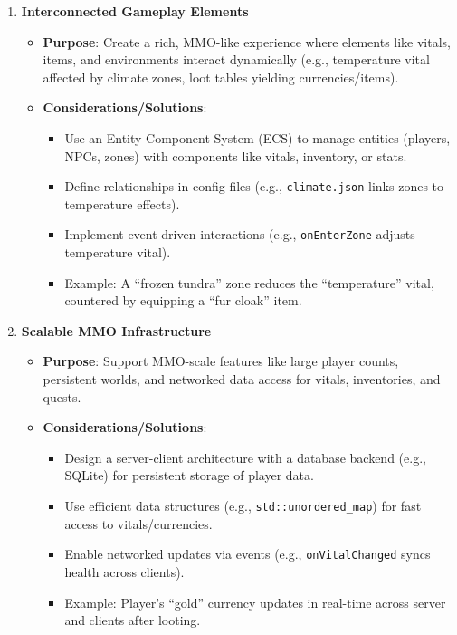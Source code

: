 \begin{enumerate}
    \item \textbf{Interconnected Gameplay Elements}
        \begin{itemize}
            \item \textbf{Purpose}: Create a rich, MMO-like experience where elements like vitals, items, and environments interact dynamically (e.g., temperature vital affected by climate zones, loot tables yielding currencies/items).
            \item \textbf{Considerations/Solutions}:
                \begin{itemize}
                    \item Use an Entity-Component-System (ECS) to manage entities (players, NPCs, zones) with components like vitals, inventory, or stats.
                    \item Define relationships in config files (e.g., \texttt{climate.json} links zones to temperature effects).
                    \item Implement event-driven interactions (e.g., \texttt{onEnterZone} adjusts temperature vital).
                    \item Example: A ``frozen tundra'' zone reduces the ``temperature'' vital, countered by equipping a ``fur cloak'' item.
                \end{itemize}
        \end{itemize}

    \item \textbf{Scalable MMO Infrastructure}
        \begin{itemize}
            \item \textbf{Purpose}: Support MMO-scale features like large player counts, persistent worlds, and networked data access for vitals, inventories, and quests.
            \item \textbf{Considerations/Solutions}:
                \begin{itemize}
                    \item Design a server-client architecture with a database backend (e.g., SQLite) for persistent storage of player data.
                    \item Use efficient data structures (e.g., \texttt{std::unordered\_map}) for fast access to vitals/currencies.
                    \item Enable networked updates via events (e.g., \texttt{onVitalChanged} syncs health across clients).
                    \item Example: Player’s ``gold'' currency updates in real-time across server and clients after looting.
                \end{itemize}
        \end{itemize}


\end{enumerate}
